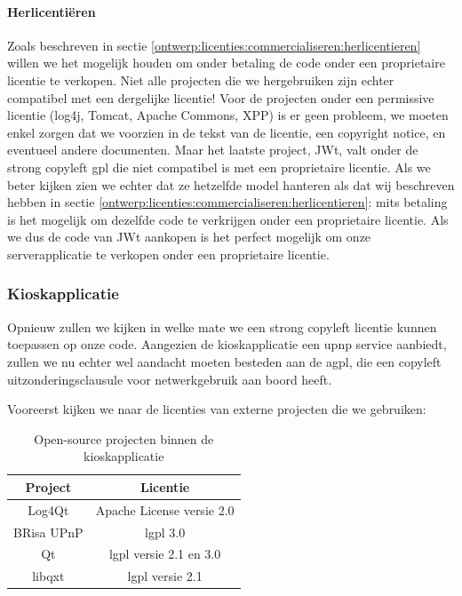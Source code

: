 \paragraph{Herlicentiëren} Zoals beschreven in sectie \ref{ontwerp:licenties:commercialiseren:herlicentieren} willen we het mogelijk houden om onder betaling de code onder een proprietaire licentie te verkopen. Niet alle projecten die we hergebruiken zijn echter compatibel met een dergelijke licentie! Voor de projecten onder een permissive licentie (log4j, Tomcat, Apache Commons, XPP) is er geen probleem, we moeten enkel zorgen dat we voorzien in de tekst van de licentie, een copyright notice, en eventueel andere documenten. Maar het laatste project, JWt, valt onder de strong copyleft \ac{gpl} die niet compatibel is met een proprietaire licentie. Als we beter kijken zien we echter dat ze hetzelfde model hanteren als dat wij beschreven hebben in sectie \ref{ontwerp:licenties:commercialiseren:herlicentieren}: mits betaling is het mogelijk om dezelfde code te verkrijgen onder een proprietaire licentie. Als we dus de code van JWt aankopen is het perfect mogelijk om onze serverapplicatie te verkopen onder een proprietaire licentie.

\subsubsection{Kioskapplicatie}
\label{ontwerp:licenties:keuze:software:kiosk}

Opnieuw zullen we kijken in welke mate we een strong copyleft licentie kunnen toepassen op onze code. Aangezien de kioskapplicatie een \ac{upnp} service aanbiedt, zullen we nu echter wel aandacht moeten besteden aan de \ac{agpl}, die een copyleft uitzonderingsclausule voor netwerkgebruik aan boord heeft.

Vooreerst kijken we naar de licenties van externe projecten die we gebruiken:
\begin{table}[h!]
  \begin{center}
    \begin{tabular}{c c}
    Project & Licentie \\
    \hline
    Log4Qt & Apache License versie 2.0 \\
    BRisa UPnP & \ac{lgpl} 3.0 \\
    Qt & \ac{lgpl} versie 2.1 en 3.0 \\
    libqxt & \ac{lgpl} versie 2.1 \\
    \end{tabular}
  \end{center}
  \caption{Open-source projecten binnen de kioskapplicatie}
\end{table}

